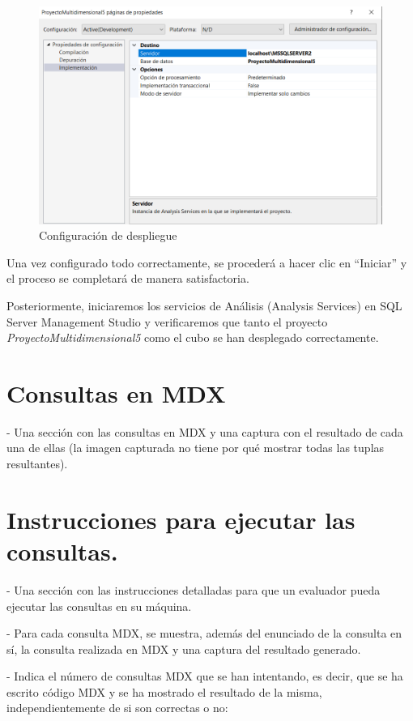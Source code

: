 \documentclass[12pt, a4paper, twoside]{article}
\begin{document}
	 \begin{figure}[H]
	 	\centering
	 	\includegraphics[width=1\textwidth]{image/despliegue}
	 	\caption{Configuración de despliegue}
	 	\label{fig:3}
	 \end{figure}
	 
	 Una vez configurado todo correctamente, se procederá a hacer clic en ``Iniciar'' y el proceso se completará de manera satisfactoria. 
	 
	Posteriormente, iniciaremos los servicios de Análisis (Analysis Services) en SQL Server Management Studio y verificaremos que tanto el proyecto \textit{ProyectoMultidimensional5} como el cubo se han desplegado correctamente.
	
	 
	
	\section{Consultas en MDX}
	- Una sección con las consultas en MDX y una captura con el resultado de cada una de ellas (la imagen capturada no tiene por qué mostrar todas las tuplas resultantes). 
	
	
	\section{Instrucciones para ejecutar las consultas.}
	- Una sección con las instrucciones detalladas para que un evaluador pueda ejecutar las consultas en su máquina. 
	
	
		- Para cada consulta MDX, se muestra, además del enunciado de la consulta en sí, la consulta realizada en MDX y una captura del resultado generado.
	
	- Indica el número de consultas MDX que se han intentando, es decir, que se ha escrito código MDX y se ha mostrado el resultado de la misma, independientemente de si son correctas o no:
	
\end{document}
